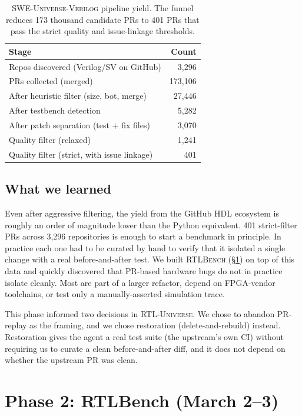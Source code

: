 \documentclass{article}
\begin{document}
\begin{table}[H]
\centering
\caption{\textsc{SWE-Universe-Verilog} pipeline yield. The funnel reduces 173 thousand
candidate PRs to 401 PRs that pass the strict quality and issue-linkage thresholds.}
\label{tab:swe-universe-yield}
\footnotesize
\begin{tabular}{lr}
\toprule
Stage & Count \\
\midrule
Repos discovered (Verilog/SV on GitHub)        & 3{,}296 \\
PRs collected (merged)                          & 173{,}106 \\
After heuristic filter (size, bot, merge)       & 27{,}446 \\
After testbench detection                       & 5{,}282 \\
After patch separation (test + fix files)       & 3{,}070 \\
Quality filter (relaxed)                        & 1{,}241 \\
Quality filter (strict, with issue linkage)     & 401 \\
\bottomrule
\end{tabular}
\end{table}

\subsection{What we learned}

Even after aggressive filtering, the yield from the GitHub HDL ecosystem is roughly an
order of magnitude lower than the Python equivalent. 401 strict-filter PRs across 3{,}296
repositories is enough to start a benchmark in principle. In practice each one had to be
curated by hand to verify that it isolated a single change with a real before-and-after
test. We built \textsc{RTLBench} (\S\ref{sec:rtlbench}) on top of this data and quickly
discovered that PR-based hardware bugs do not in practice isolate cleanly. Most are part of
a larger refactor, depend on FPGA-vendor toolchains, or test only a manually-asserted
simulation trace.

This phase informed two decisions in \textsc{RTL-Universe}. We chose to abandon PR-replay
as the framing, and we chose restoration (delete-and-rebuild) instead. Restoration gives
the agent a real test suite (the upstream's own CI) without requiring us to curate a clean
before-and-after diff, and it does not depend on whether the upstream PR was clean.

\section{Phase 2: RTLBench (March 2--3)}
\label{sec:rtlbench}
\end{document}
